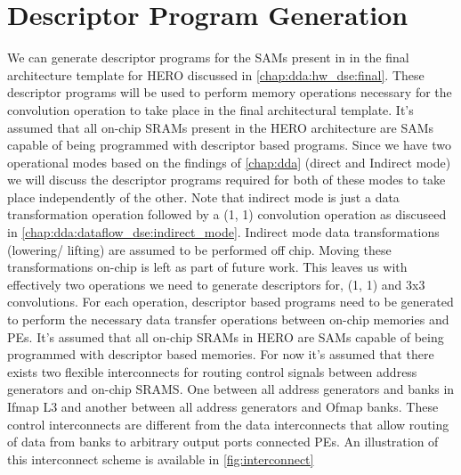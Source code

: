 \clearpage

\section{Descriptor Program Generation}
\label{chap:sams:acc_scheduling}

We can generate descriptor programs for the SAMs present in
in the final architecture template for HERO discussed in \autoref{chap:dda:hw_dse:final}.
These descriptor programs will be used to perform memory operations necessary
for the convolution operation to take place in the final architectural template.
It's assumed that all on-chip SRAMs present in the HERO architecture are SAMs
capable of being programmed with descriptor based programs.   
Since we have two operational modes based on the findings of
\autoref{chap:dda} (direct and Indirect mode) we will discuss the
descriptor programs required for both of these modes to take place independently of
the other. Note that indirect mode is just a data transformation operation
followed by a (1, 1) convolution operation as discuseed in
\autoref{chap:dda:dataflow_dse:indirect_mode}. Indirect mode data
transformations (lowering/ lifting) are assumed to be performed off chip. Moving
these transformations on-chip is left as part of future work. This leaves us
with effectively two operations we need to generate descriptors for, (1, 1) and 3x3
convolutions. For each operation, descriptor based programs need to be generated
to perform the necessary data transfer operations between on-chip memories and
PEs. It's assumed that all on-chip SRAMs in HERO are SAMs capable of being
programmed with descriptor based memories. 
For now it's assumed that there exists two flexible interconnects for routing
control signals between address generators and on-chip SRAMS. One between all
address generators and banks in Ifmap L3 and another between all address
generators and Ofmap banks. These control interconnects are different from the
data interconnects that allow routing of data from banks to arbitrary output
ports connected PEs. An illustration of this interconnect scheme is available in
\autoref{fig:interconnect}

